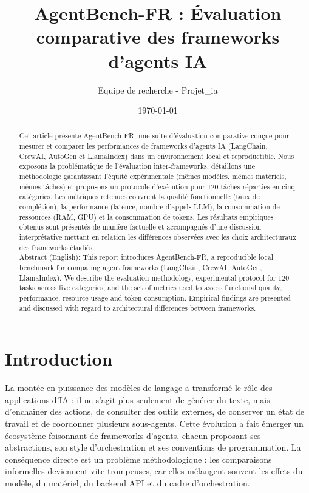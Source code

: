 \documentclass[11pt,a4paper]{article}
\title{AgentBench-FR : Évaluation comparative des frameworks d'agents IA}
\author{Equipe de recherche - Projet\_ia}
\date{\today}
\begin{document}
\maketitle
\begin{abstract}
Cet article présente AgentBench-FR, une suite d'évaluation comparative conçue pour mesurer et comparer les performances de frameworks d'agents IA (LangChain, CrewAI, AutoGen et LlamaIndex) dans un environnement local et reproductible. Nous exposons la problématique de l'évaluation inter-frameworks, détaillons une méthodologie garantissant l'équité expérimentale (mêmes modèles, mêmes matériels, mêmes tâches) et proposons un protocole d'exécution pour 120 tâches réparties en cinq catégories. Les métriques retenues couvrent la qualité fonctionnelle (taux de complétion), la performance (latence, nombre d'appels LLM), la consommation de ressources (RAM, GPU) et la consommation de tokens. Les résultats empiriques obtenus sont présentés de manière factuelle et accompagnés d'une discussion interprétative mettant en relation les différences observées avec les choix architecturaux des frameworks étudiés.
\\
Abstract (English): This report introduces AgentBench-FR, a reproducible local benchmark for comparing agent frameworks (LangChain, CrewAI, AutoGen, LlamaIndex). We describe the evaluation methodology, experimental protocol for 120 tasks across five categories, and the set of metrics used to assess functional quality, performance, resource usage and token consumption. Empirical findings are presented and discussed with regard to architectural differences between frameworks.
\end{abstract}

\tableofcontents
\newpage

\section*{Introduction}
La montée en puissance des modèles de langage a transformé le rôle des applications d'IA : il ne s'agit plus seulement de générer du texte, mais d'enchaîner des actions, de consulter des outils externes, de conserver un état de travail et de coordonner plusieurs sous-agents. Cette évolution a fait émerger un écosystème foisonnant de frameworks d'agents, chacun proposant ses abstractions, son style d'orchestration et ses conventions de programmation. La conséquence directe est un problème méthodologique : les comparaisons informelles deviennent vite trompeuses, car elles mélangent souvent les effets du modèle, du matériel, du backend API et du cadre d'orchestration.
\end{document}
